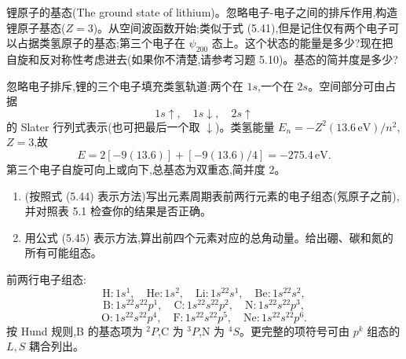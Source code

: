 \begin{question}
锂原子的基态(The ground state of lithium)。忽略电子-电子之间的排斥作用,构造锂原子基态($Z=3$)。从空间波函数开始;类似于式 (5.41),但是记住仅有两个电子可以占据类氢原子的基态;第三个电子在 $\psi_{200}$ 态上。这个状态的能量是多少?现在把自旋和反对称性考虑进去(如果你不清楚,请参考习题 5.10)。基态的简并度是多少?

\par\smallskip
{}

\end{question}
\begin{solution}

忽略电子排斥,锂的三个电子填充类氢轨道:两个在 $1s$,一个在 $2s$。空间部分可由占据
\[
1s\uparrow,
\quad 1s\downarrow,
\quad 2s\uparrow
\]
的 Slater 行列式表示(也可把最后一个取 $\downarrow$)。类氢能量 $E_n=-Z^2(13.6\,\mathrm{eV})/n^2$,$Z=3$,故
\[
E=2[-9(13.6)]+[-9(13.6)/4]
=-275.4\,\mathrm{eV}.
\]
第三个电子自旋可向上或向下,总基态为双重态,简并度 2。

\end{solution}

\begin{question}
\begin{enumerate}
\item (按照式 (5.44) 表示方法)写出元素周期表前两行元素的电子组态(氖原子之前),并对照表 5.1 检查你的结果是否正确。
\item 用公式 (5.45) 表示方法,算出前四个元素对应的总角动量。给出硼、碳和氮的所有可能组态。
\end{enumerate}

\par\smallskip
{}

\end{question}
\begin{solution}

前两行电子组态:
\[
\mathrm H:1s^1,
\quad \mathrm{He}:1s^2,
\quad \mathrm{Li}:1s^22s^1,
\quad \mathrm{Be}:1s^22s^2,
\]
\[
\mathrm B:1s^22s^22p^1,
\quad \mathrm C:1s^22s^22p^2,
\quad \mathrm N:1s^22s^22p^3,
\]
\[
\mathrm O:1s^22s^22p^4,
\quad \mathrm F:1s^22s^22p^5,
\quad \mathrm{Ne}:1s^22s^22p^6.
\]
按 Hund 规则,B 的基态项为 ${}^2P$,C 为 ${}^3P$,N 为 ${}^4S$。更完整的项符号可由 $p^k$ 组态的 $L,S$ 耦合列出。

\end{solution}

